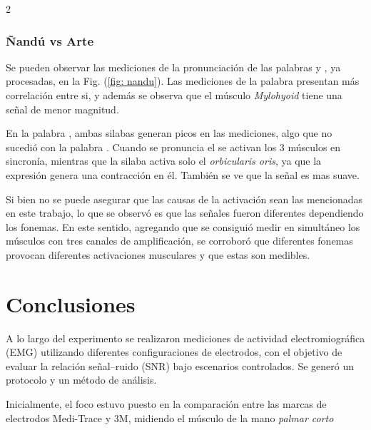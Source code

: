 \documentclass[11pt,letterpaper]{article}
\begin{document}
\begin{multicols*}{2}
\subsubsection{Ñandú vs Arte}
\vspace{-3mm}
Se pueden observar las mediciones de la pronunciación de las palabras  y , ya procesadas, en la Fig. (\ref{fig: nandu}). Las mediciones de la palabra  presentan más correlación entre si, y además se observa que el músculo \textit{Mylohyoid} tiene una señal de menor magnitud.

En la palabra , ambas silabas generan picos en las mediciones, algo que no sucedió con la palabra . Cuando se pronuncia el  se activan los 3 músculos en sincronía, mientras que la silaba  activa solo el \textit{orbicularis oris}, ya que la expresión genera una contracción en él. También se ve que la señal es mas suave.

Si bien no se puede asegurar que las causas de la activación sean las mencionadas en este trabajo, lo que se observó es que las señales fueron diferentes dependiendo los fonemas. En este sentido, agregando que se consiguió medir en simultáneo los músculos con tres canales de amplificación, se corroboró que diferentes fonemas provocan diferentes activaciones musculares y que estas son medibles.

\vspace{-5mm}
\section{Conclusiones}
\vspace{-4mm}
A lo largo del experimento se realizaron mediciones de actividad electromiográfica (EMG) utilizando diferentes configuraciones de electrodos, con el objetivo de evaluar la relación señal–ruido (SNR) bajo escenarios controlados. Se generó un protocolo y un método de análisis.

Inicialmente, el foco estuvo puesto en la comparación entre las marcas de electrodos Medi-Trace y 3M, midiendo el músculo de la mano \textit{palmar corto}


\end{multicols*}
\end{document}
